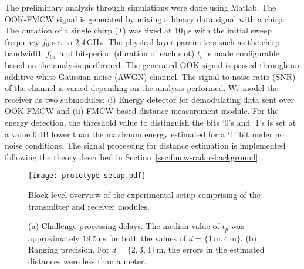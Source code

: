 \documentclass{sig-alternate-10pt}
\newcommand{\unit}[1]{\ensuremath{\, \mathrm{#1}}}
\begin{document}
The preliminary analysis through simulations were done using Matlab. The
OOK-FMCW signal is generated by mixing a binary data signal with a chirp. The
duration of a single chirp ($T$) was fixed at $10\unit{\mu s}$ with the initial
sweep frequency $f_0$ set to $2.4\unit{GHz}$. The physical layer parameters such
as the chirp bandwidth $f_{bw}$ and bit-period (duration of each slot) $t_b$ is
made configurable based on the analysis performed. The generated OOK signal is
passed through an additive white Gaussian noise (AWGN) channel. The signal to
noise ratio (SNR) of the channel is varied depending on the analysis performed.
We model the receiver as two submodules: (i) Energy detector for demodulating
data sent over OOK-FMCW and (ii) FMCW-based distance measurement module. For the
energy detection, the threshold value to distinguish the bits `0's and `1's is
set at a value $6\unit{dB}$ lower than the maximum energy estimated for a `1'
bit under no noise conditions. The signal processing for distance estimation is
implemented following the theory described in
Section~\ref{sec:fmcw-radar-background}.

\begin{figure}[t]
  \centering
  \texttt{[image: prototype-setup.pdf]}
  \caption{Block level overview of the experimental setup comprising of the
    transmitter and receiver modules.}
  \label{fig:prototype-setup}
\end{figure}


\begin{figure*}[t]
  \centering {}
  \hspace{0.02\textwidth} 
 
\caption{(a) Challenge processing delays. The median value of $t_p$ was
  approximately $19.5\unit{ns}$ for both the values of $d=\{1\unit{m},
  4\unit{m}\}$. (b) Ranging precision. For $d=\{2,3,4\}\unit{m}$, the errors in
  the estimated distances were less than a meter.}
  \label{fig:exp-results}
\end{figure*}
\end{document}

